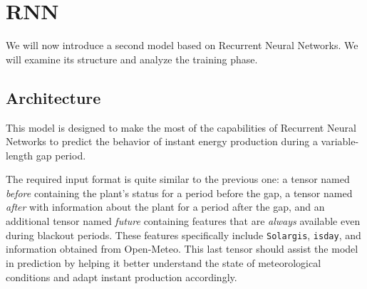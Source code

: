 \section{RNN}\label{sec:rnnbasemodel}
We will now introduce a second model based on Recurrent Neural Networks.
We will examine its structure and analyze the training phase.


\subsection{Architecture}
This model is designed to make the most of the capabilities of
Recurrent Neural Networks to predict the behavior of instant
energy production during a variable-length gap period.

The required input format is quite similar to the previous one: a tensor named \textit{before} containing the plant's status for a period before the gap, a tensor named \textit{after} with information about the plant for a period after the gap, and an additional tensor named \textit{future} containing features that are \textit{always} available even during blackout periods. These features specifically include \verb|Solargis|, \verb|isday|, and information obtained from Open-Meteo. This last tensor should assist the model in prediction by helping it better understand the state of meteorological conditions and adapt instant production accordingly.


